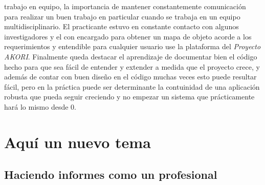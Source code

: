 { 	trabajo en equipo, la importancia de mantener constantemente comunicación para realizar un 
 	buen trabajo en particular cuando se trabaja en un equipo multidisciplinario. El practicante
 	estuvo en constante contacto con algunos investigadores y el con encargado para obtener un 
 	mapa de objeto acorde a los requerimientos y entendible para cualquier usuario use la 
 	plataforma del \textit{Proyecto AKORI}. Finalmente queda destacar el aprendizaje de documentar
 	bien el código hecho para que sea fácil de entender y extender a medida que el proyecto crece, 
 	y además de contar con buen diseño en el código muchas veces esto puede resultar fácil, pero
 	en la práctica puede ser determinante la contuinidad de una aplicación robusta que pueda seguir
 	creciendo y no empezar un sistema que prácticamente hará lo mismo desde 0.}

\newpage
\section{Aquí un nuevo tema}
	
	\subsection{Haciendo informes como un profesional}
		
		
		\lipsum[1]

		\newp \lipsum[115]
		\newp \lipsum[2]
		
		
		\lipsum[115]
		
		\newp \lipsum[4]
		
